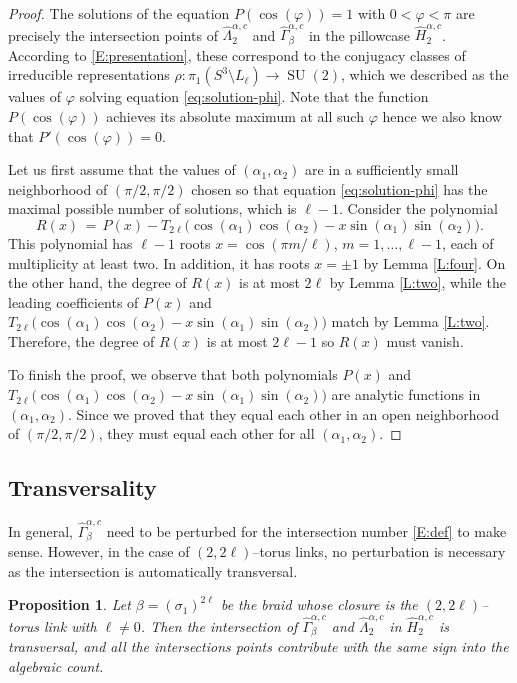 \documentclass[11pt,reqno]{amsart}
\newtheorem{proposition}[theorem]{Proposition}
\theoremstyle{definition}
\renewcommand{\phi}{\varphi}
\newcommand{\SU}{\operatorname{SU}}
\begin{document}
\begin{sloppypar}
\begin{proof}
The solutions of the equation $P(\cos(\phi)) = 1$ with $0 < \phi < \pi$ are precisely the intersection points of $\widehat{\Lambda}_2^{\alpha, c}$ and $\widehat{\Gamma}_{\beta}^{\alpha,c}$ in the pillowcase $\widehat{H}_2^{\alpha, c}$. According to \eqref{E:presentation}, these correspond to the conjugacy classes of irreducible representations $\rho: \pi_1 (S^3 \setminus L_{\ell}) \to \SU(2)$, which we described as the values of $\phi$ solving equation \eqref{eq:solution-phi}. Note that the function $P(\cos(\phi))$ achieves its absolute maximum at all such $\phi$ hence we also know that $P'(\cos(\phi)) = 0$.

Let us first assume that the values of $(\alpha_1,\alpha_2)$ are in a sufficiently small neighborhood of $(\pi/2,\pi/2)$ chosen so that equation \eqref{eq:solution-phi} has the maximal possible number of solutions, which is $\ell - 1$. Consider the polynomial 
\[
R(x)\, = \, P(x) - T_{2\ell} \big( \cos(\alpha_1) \cos(\alpha_2) - x\sin(\alpha_1) \sin(\alpha_2) \big).
\] 
This polynomial has $\ell - 1$ roots $x = \cos(\pi m/\ell)$, $m = 1,\ldots, \ell -1$, each of multiplicity at least two. In addition, it has roots $x = \pm 1$ by Lemma \ref{L:four}. On the other hand, the degree of $R(x)$ is at most $2\ell$ by Lemma \ref{L:two}, while the leading coefficients of $P(x)$ and $T_{2\ell} \big( \cos(\alpha_1) \cos(\alpha_2) - x\sin(\alpha_1) \sin(\alpha_2) \big)$ match by Lemma \ref{L:two}. Therefore, the degree of $R(x)$ is at most $2\ell - 1$ so $R(x)$ must vanish.

To finish the proof, we observe that both polynomials $P(x)$ and $T_{2\ell} \big( \cos(\alpha_1) \cos(\alpha_2) - x\sin(\alpha_1) \sin(\alpha_2) \big)$ are analytic functions in $(\alpha_1, \alpha_2)$. Since we proved that they equal each other in an open neighborhood of $(\pi/2,\pi/2)$, they must equal each other for all $(\alpha_1, \alpha_2)$.
\end{proof}

\subsection{Transversality}
In general, $\widehat{\Gamma}_{\beta}^{\alpha,c}$ need to be perturbed for the intersection number \eqref{E:def} to make sense. However, in the case of $(2,2\ell)$--torus links, no perturbation is necessary as the intersection is automatically transversal.
	
\begin{proposition}\label{P:transverse}
Let $\beta = (\sigma_1)^{2\ell}$ be the braid whose closure is the $(2,2\ell)$--torus link with $\ell \neq 0$. Then the intersection of $\widehat{\Gamma}_{\beta}^{\alpha,c}$ and $\widehat{\Lambda}_2^{\alpha, c}$ in $\widehat{H}_2^{\alpha, c}$ is transversal, and all the intersections points contribute with the same sign into the algebraic count.
\end{proposition}
	

\end{sloppypar}
\end{document}

